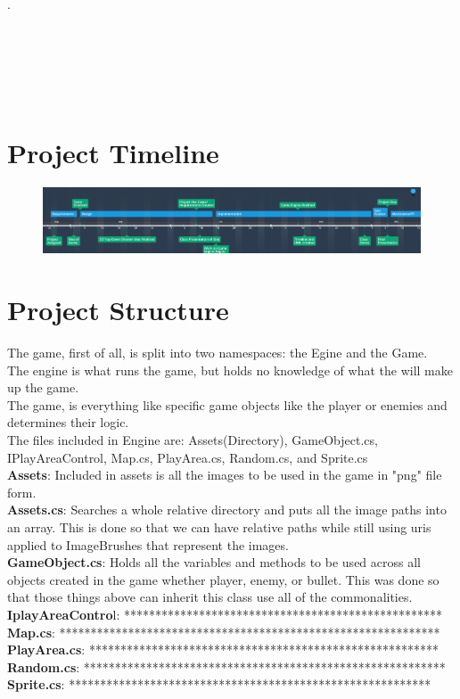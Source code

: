 \documentclass[10pt,conference,onecolumn,compsoc]{IEEEtran}
\begin{document}
.\\\\\\\\\\\\
\section{Project Timeline} 
\begin{figure}[ht!]
\includegraphics[scale=.45]{game_timeline.png}
\caption{}
\label{Timeline}
\end{figure}




\section{Project Structure}
The game, first of all, is split into two namespaces: the Egine and the Game. \\
The engine is what runs the game, but holds no knowledge of what the will make up the game.\\
The game, is everything like specific game objects like the player or enemies and determines their logic.\\

The files included in Engine are: Assets(Directory), GameObject.cs, IPlayAreaControl, Map.cs, PlayArea.cs, Random.cs, and Sprite.cs\\

\textbf{Assets}: Included in assets is all the images to be used in the game in "png" file form. \\
\textbf{Assets.cs}: Searches a whole relative directory and puts all the image paths into an array. This is done so that we can have relative
paths while still using uris applied to ImageBrushes that represent the images.\\
\textbf{GameObject.cs}: Holds all the variables and methods to be used across all objects created in the game whether player, enemy, or bullet.
This was done so that those things above can inherit this class use all of the commonalities.\\
\textbf{IplayAreaContro}l: ***************************************************\\
\textbf{Map.cs}: *************************************************************\\
\textbf{PlayArea.cs}: ********************************************************\\
\textbf{Random.cs}: **********************************************************\\
\textbf{Sprite.cs}: **********************************************************\\
\end{document}
